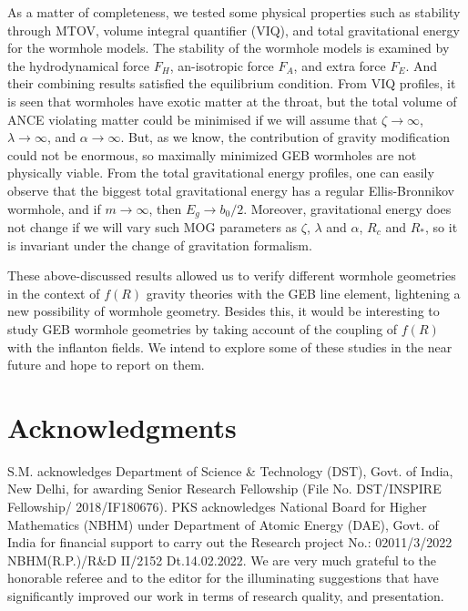 As a matter of completeness, we tested some physical properties such as stability through MTOV, volume integral quantifier (VIQ), and total gravitational energy for the wormhole models. The stability of the wormhole models is examined by the hydrodynamical force $F_H$, an-isotropic force $F_A$, and extra force $F_E$. And their combining results satisfied the equilibrium condition. From VIQ profiles, it is seen that wormholes have exotic matter at the throat, but the total volume of ANCE violating matter could be minimised if we will assume that $\zeta\to \infty$,\, $\lambda\rightarrow \infty$, and $\alpha\rightarrow\infty$. But, as we know, the contribution of gravity modification could not be enormous, so maximally minimized GEB wormholes are not physically viable. From the total gravitational energy profiles, one can easily observe that the biggest total gravitational energy has a regular Ellis-Bronnikov wormhole, and if $m\to\infty$, then $E_g\to b_0/2$. Moreover, gravitational energy does not change if we will vary such MOG parameters as $\zeta$, $\lambda$ and $\alpha$, $R_c$ and $R_*$, so it is invariant under the change of gravitation formalism.

These above-discussed results allowed us to verify different wormhole geometries in the context of $f(R)$ gravity theories with the GEB line element, lightening a new possibility of wormhole geometry. Besides this, it would be interesting to study GEB wormhole geometries by taking account of the coupling of $f(R)$ with the inflanton fields. We intend to explore some of these studies in the near future and hope to report on them.


\section*{Acknowledgments}

S.M. acknowledges Department of Science \& Technology (DST), Govt. of India, New Delhi, for awarding Senior Research Fellowship (File No. DST/INSPIRE Fellowship/ 2018/IF180676). PKS acknowledges National Board for Higher Mathematics (NBHM) under Department of Atomic Energy (DAE), Govt. of India for financial support to carry out the Research project No.: 02011/3/2022 NBHM(R.P.)/R\&D II/2152 Dt.14.02.2022.  We are very much grateful to the honorable referee and to the editor for the illuminating suggestions that have significantly improved our work in terms of research quality, and presentation. 


